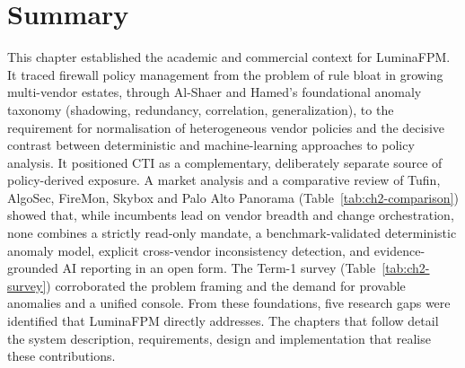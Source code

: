 \section{Summary}
\label{sec:ch2-summary}
This chapter established the academic and commercial context for LuminaFPM. It traced firewall policy management from the problem of rule bloat in growing multi-vendor estates, through Al-Shaer and Hamed's foundational anomaly taxonomy (shadowing, redundancy, correlation, generalization), to the requirement for normalisation of heterogeneous vendor policies and the decisive contrast between deterministic and machine-learning approaches to policy analysis. It positioned CTI as a complementary, deliberately separate source of policy-derived exposure. A market analysis and a comparative review of Tufin, AlgoSec, FireMon, Skybox and Palo Alto Panorama (Table~\ref{tab:ch2-comparison}) showed that, while incumbents lead on vendor breadth and change orchestration, none combines a strictly read-only mandate, a benchmark-validated deterministic anomaly model, explicit cross-vendor inconsistency detection, and evidence-grounded AI reporting in an open form. The Term-1 survey (Table~\ref{tab:ch2-survey}) corroborated the problem framing and the demand for provable anomalies and a unified console. From these foundations, five research gaps were identified that LuminaFPM directly addresses. The chapters that follow detail the system description, requirements, design and implementation that realise these contributions.
